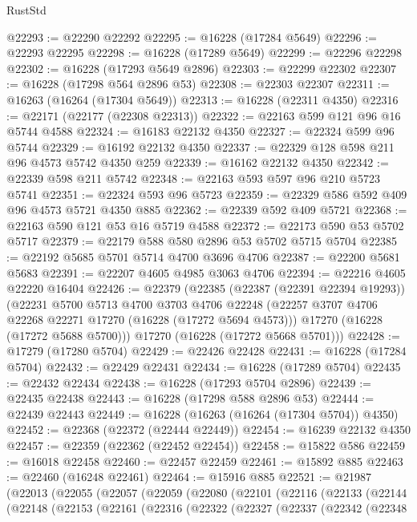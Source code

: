 \begin{lexlean}{RustStd}
\begin{coremodule}
@22293 := @22290 @22292
@22295 := @16228 (@17284 @5649)
@22296 := @22293 @22295
@22298 := @16228 (@17289 @5649)
@22299 := @22296 @22298
@22302 := @16228 (@17293 @5649 @2896)
@22303 := @22299 @22302
@22307 := @16228 (@17298 @564 @2896 @53)
@22308 := @22303 @22307
@22311 := @16263 (@16264 (@17304 @5649))
@22313 := @16228 (@22311 @4350)
@22316 := @22171 (@22177 (@22308 @22313))
@22322 := @22163 @599 @121 @96 @16 @5744 @4588
@22324 := @16183 @22132 @4350
@22327 := @22324 @599 @96 @5744
@22329 := @16192 @22132 @4350
@22337 := @22329 @128 @598 @211 @96 @4573 @5742 @4350 @259
@22339 := @16162 @22132 @4350
@22342 := @22339 @598 @211 @5742
@22348 := @22163 @593 @597 @96 @210 @5723 @5741
@22351 := @22324 @593 @96 @5723
@22359 := @22329 @586 @592 @409 @96 @4573 @5721 @4350 @885
@22362 := @22339 @592 @409 @5721
@22368 := @22163 @590 @121 @53 @16 @5719 @4588
@22372 := @22173 @590 @53 @5702 @5717
@22379 := @22179 @588 @580 @2896 @53 @5702 @5715 @5704
@22385 := @22192 @5685 @5701 @5714 @4700 @3696 @4706
@22387 := @22200 @5681 @5683
@22391 := @22207 @4605 @4985 @3063 @4706
@22394 := @22216 @4605 @22220 @16404
@22426 := @22379
    (@22385
      (@22387 (@22391 @22394 @19293))
      (@22231
        @5700
        @5713
        @4700
        @3703
        @4706
        @22248
        (@22257 @3707 @4706 @22268 @22271 @17270 (@16228 (@17272 @5694 @4573)))
        @17270
        (@16228 (@17272 @5688 @5700)))
      @17270
      (@16228 (@17272 @5668 @5701)))
@22428 := @17279 (@17280 @5704)
@22429 := @22426 @22428
@22431 := @16228 (@17284 @5704)
@22432 := @22429 @22431
@22434 := @16228 (@17289 @5704)
@22435 := @22432 @22434
@22438 := @16228 (@17293 @5704 @2896)
@22439 := @22435 @22438
@22443 := @16228 (@17298 @588 @2896 @53)
@22444 := @22439 @22443
@22449 := @16228 (@16263 (@16264 (@17304 @5704)) @4350)
@22452 := @22368 (@22372 (@22444 @22449))
@22454 := @16239 @22132 @4350
@22457 := @22359 (@22362 (@22452 @22454))
@22458 := @15822 @586
@22459 := @16018 @22458
@22460 := @22457 @22459
@22461 := @15892 @885
@22463 := @22460 (@16248 @22461)
@22464 := @15916 @885
@22521 := @21987
    (@22013
      (@22055
        (@22057
          (@22059
            (@22080
              (@22101
                (@22116
                  (@22133
                    (@22144
                      (@22148
                        (@22153
                          (@22161
                            (@22316
                              (@22322
                                (@22327
                                  (@22337
                                    (@22342
                                      (@22348

\end{coremodule}
\end{lexlean}

